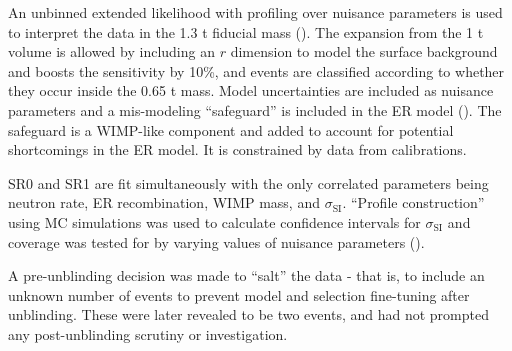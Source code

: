An unbinned extended likelihood with profiling over nuisance parameters is used to interpret the data in the 1.3 t fiducial mass
().  The expansion from the 1 t volume is allowed by including an $r$ dimension to model the surface
background and boosts the sensitivity by 10\%, and events are classified according to whether they occur inside the 0.65 t
mass.  Model uncertainties are included as nuisance parameters and a mis-modeling ``safeguard'' is included in the ER model
().  The
safeguard is a WIMP-like component and added to account for potential shortcomings in the ER model.  It is constrained by data from
 calibrations.

SR0 and SR1 are fit simultaneously with the only correlated parameters being neutron rate, ER recombination, WIMP mass, and
$\sigma_{\mathrm{SI}}$.  ``Profile construction'' using MC simulations was used to calculate confidence intervals for
$\sigma_{\mathrm{SI}}$ and coverage was tested for by varying values of nuisance parameters ().

A pre-unblinding decision was made to ``salt'' the data - that is, to include an unknown number of events to prevent model and
selection fine-tuning after unblinding.  These were later revealed to be two \ambe events, and had not prompted any post-unblinding
scrutiny or investigation.

